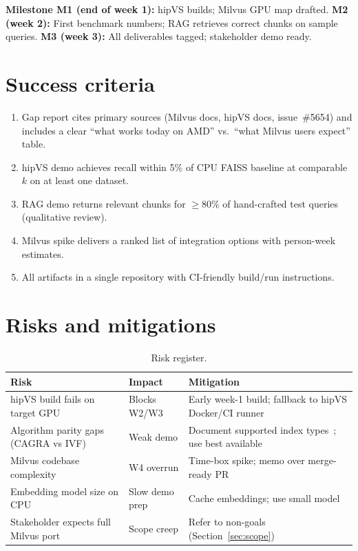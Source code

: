 \documentclass[11pt,a4paper]{article}
\begin{document}
\textbf{Milestone M1 (end of week 1):} hipVS builds; Milvus GPU map drafted.
\textbf{M2 (week 2):} First benchmark numbers; RAG retrieves correct chunks on sample queries.
\textbf{M3 (week 3):} All deliverables tagged; stakeholder demo ready.

\section{Success criteria}
\label{sec:success}

\begin{enumerate}[label=\textbf{S\arabic*.}, leftmargin=*]
  \item Gap report cites primary sources (Milvus docs, hipVS docs, issue~\#5654) and
        includes a clear ``what works today on AMD'' vs.\ ``what Milvus users expect'' table.
  \item hipVS demo achieves recall within 5\% of CPU FAISS baseline at comparable $k$ on
        at least one dataset.
  \item RAG demo returns relevant chunks for $\geq$80\% of hand-crafted test queries
        (qualitative review).
  \item Milvus spike delivers a ranked list of integration options with person-week estimates.
  \item All artifacts in a single repository with CI-friendly build/run instructions.
\end{enumerate}

\section{Risks and mitigations}
\label{sec:risks}

\begin{table}[htbp]
  \centering
  \caption{Risk register.}
  \label{tab:risks}
  \begin{tabularx}{\textwidth}{@{}%
    >{\raggedright\arraybackslash}p{}%
    >{\raggedright\arraybackslash}p{}%
    >{\raggedright\arraybackslash}X@{}}
    \toprule
    \textbf{Risk} & \textbf{Impact} & \textbf{Mitigation} \\
    \midrule
    hipVS build fails on target GPU &
    Blocks W2/W3 &
    Early week-1 build; fallback to hipVS Docker/CI runner \\
    Algorithm parity gaps (CAGRA vs IVF) &
    Weak demo &
    Document supported index types~\cite{hipvs-whatis}; use best available \\
    Milvus codebase complexity &
    W4 overrun &
    Time-box spike; memo over merge-ready PR \\
    Embedding model size on CPU &
    Slow demo prep &
    Cache embeddings; use small model \\
    Stakeholder expects full Milvus port &
    Scope creep &
    Refer to non-goals (Section~\ref{sec:scope}) \\
    \bottomrule
  \end{tabularx}
\end{table}
\end{document}
